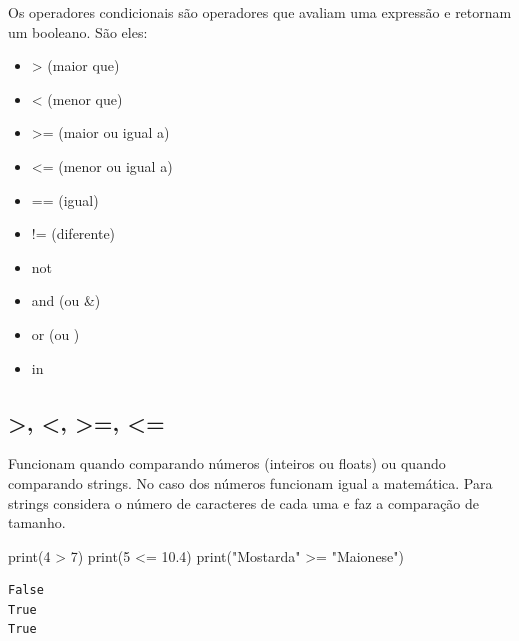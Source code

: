 \documentclass[
  letterpaper,
  DIV=11,
  numbers=noendperiod]{scrreprt}
\newenvironment{Shaded}{\begin{snugshade}}{\end{snugshade}}
\newcommand{\BuiltInTok}[1]{\textcolor[rgb]{0.00,0.23,0.31}{#1}}
\newcommand{\DecValTok}[1]{\textcolor[rgb]{0.68,0.00,0.00}{#1}}
\newcommand{\FloatTok}[1]{\textcolor[rgb]{0.68,0.00,0.00}{#1}}
\newcommand{\NormalTok}[1]{\textcolor[rgb]{0.00,0.23,0.31}{#1}}
\newcommand{\OperatorTok}[1]{\textcolor[rgb]{0.37,0.37,0.37}{#1}}
\newcommand{\StringTok}[1]{\textcolor[rgb]{0.13,0.47,0.30}{#1}}
\providecommand{\tightlist}{%
  \setlength{\itemsep}{0pt}\setlength{\parskip}{0pt}}\usepackage{longtable,booktabs,array}
\begin{document}
Os operadores condicionais são operadores que avaliam uma expressão e
retornam um booleano. São eles:

\begin{itemize}
\tightlist
\item
  \textgreater{} (maior que)
\item
  \textless{} (menor que)
\item
  \textgreater= (maior ou igual a)
\item
  \textless= (menor ou igual a)
\item
  == (igual)
\item
  != (diferente)
\item
  not
\item
  and (ou \&)
\item
  or (ou \textbar)
\item
  in
\end{itemize}

\hypertarget{section-1}{%
\subsection{\textgreater, \textless, \textgreater=,
\textless=}\label{section-1}}

Funcionam quando comparando números (inteiros ou floats) ou quando
comparando strings. No caso dos números funcionam igual a matemática.
Para strings considera o número de caracteres de cada uma e faz a
comparação de tamanho.

\begin{Shaded}
\begin{Highlighting}[]
    \BuiltInTok{print}\NormalTok{(}\DecValTok{4} \OperatorTok{\textgreater{}} \DecValTok{7}\NormalTok{)}
    \BuiltInTok{print}\NormalTok{(}\DecValTok{5} \OperatorTok{\textless{}=} \FloatTok{10.4}\NormalTok{)}
    \BuiltInTok{print}\NormalTok{(}\StringTok{"Mostarda"} \OperatorTok{\textgreater{}=} \StringTok{"Maionese"}\NormalTok{)}
\end{Highlighting}
\end{Shaded}

\begin{tcolorbox}[enhanced jigsaw, breakable, leftrule=.75mm, left=2mm, opacityback=0, bottomrule=.15mm, toprule=.15mm, rightrule=.15mm, arc=.35mm, colback=white]

\begin{verbatim}
False
True
True
\end{verbatim}

\end{tcolorbox}
\end{document}
